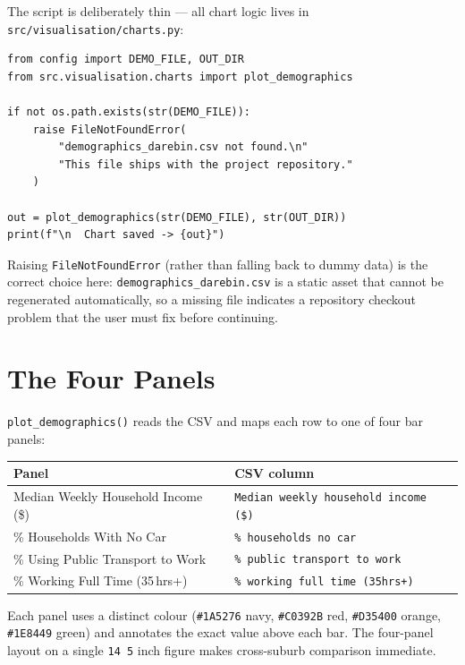 \documentclass[11pt,a4paper,openany]{book}
\begin{document}
The script is deliberately thin --- all chart logic lives in
\texttt{src/visualisation/charts.py}:

\begin{lstlisting}[style=python, caption={demographics\_chart.py --- thin entry point.}]
from config import DEMO_FILE, OUT_DIR
from src.visualisation.charts import plot_demographics

if not os.path.exists(str(DEMO_FILE)):
    raise FileNotFoundError(
        "demographics_darebin.csv not found.\n"
        "This file ships with the project repository."
    )

out = plot_demographics(str(DEMO_FILE), str(OUT_DIR))
print(f"\n  Chart saved -> {out}")
\end{lstlisting}

Raising \texttt{FileNotFoundError} (rather than falling back to dummy data) is the
correct choice here: \texttt{demographics\_darebin.csv} is a static asset that cannot be
regenerated automatically, so a missing file indicates a repository checkout problem that
the user must fix before continuing.

\section{The Four Panels}

\texttt{plot\_demographics()} reads the CSV and maps each row to one of four bar panels:

\begin{center}
\begin{tabular}{lL{8cm}}
\toprule
Panel & CSV column \\
\midrule
Median Weekly Household Income (\$) & \texttt{Median weekly household income (\$)} \\
\% Households With No Car & \texttt{\% households no car} \\
\% Using Public Transport to Work & \texttt{\% public transport to work} \\
\% Working Full Time (35\,hrs+) & \texttt{\% working full time (35hrs+)} \\
\bottomrule
\end{tabular}
\end{center}

Each panel uses a distinct colour (\texttt{\#1A5276} navy, \texttt{\#C0392B} red,
\texttt{\#D35400} orange, \texttt{\#1E8449} green) and annotates the exact value above
each bar.  The four-panel layout on a single \texttt{14 \texttimes{} 5} inch figure
makes cross-suburb comparison immediate.
\end{document}
